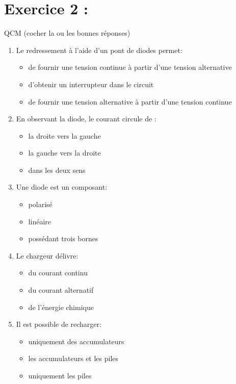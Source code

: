 \documentclass[11pt,a4paper]{article}
\begin{document}
\newpage

\section*{Exercice 2 :} 
QCM (cocher la ou les bonnes réponses)

\vspace{0.5em}

\small
\begin{enumerate}
\item Le redressement à l'aide d'un pont de diodes permet:
\begin{itemize}[label=$\square$]
\item de fournir une tension continue à partir d'une tension alternative
\item d'obtenir un interrupteur dans le circuit
\item de fournir une tension alternative à partir d'une tension continue
\end{itemize}

\item En observant la diode, le courant circule de :
\begin{itemize}[label=$\square$]
\item la droite vers la gauche
\item la gauche vers la droite
\item dans les deux sens
\end{itemize}

\item Une diode est un composant:
\begin{itemize}[label=$\square$]
\item polarisé
\item linéaire
\item possédant trois bornes
\end{itemize}

\item Le chargeur délivre:
\begin{itemize}[label=$\square$]
\item du courant continu
\item du courant alternatif
\item de l'énergie chimique
\end{itemize}

\item Il est possible de recharger:
\begin{itemize}[label=$\square$]
\item uniquement des accumulateurs
\item les accumulateurs et les piles
\item uniquement les piles
\end{itemize}


\end{enumerate}
\end{document}

